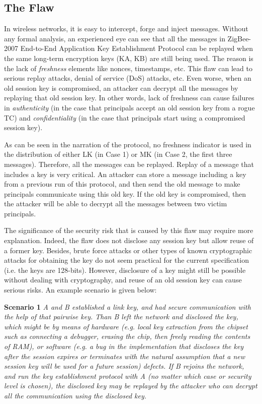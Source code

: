 \subsection{The Flaw}
\label{flaw}
In wireless networks, it is easy to intercept, forge and inject messages. 
Without any formal analysis, an experienced eye can see that all the messages in ZigBee-2007 End-to-End Application Key Establishment Protocol can be replayed 
when the same long-term encryption keys (KA, KB) are still being used. 
The reason is the lack of \emph{freshness} elements like nonces, timestamps, etc. 
This flaw can lead to serious replay attacks, denial of service (DoS) attacks, etc. 
Even worse, when an old session key is compromised, an attacker can decrypt all the messages by replaying that old session key. In other words, lack of freshness can cause failures in \emph{authenticity} (in the case that principals accept an old session key from a rogue TC) and \emph{confidentiality} (in the case that principals start using a compromised session key).

As can be seen in the narration of the protocol, no freshness indicator is used in the distribution of either LK (in Case 1) or MK (in Case 2, the first three messages). 
Therefore, all the messages can be replayed. 
Replay of a message that includes a key is very critical. 
An attacker can store a message including a key from a previous run of this protocol, and then send the old message to make principals communicate using this old key. 
If the old key is compromised, then the attacker will be able to decrypt all the messages between two victim principals. 

The significance of the security risk that is caused by this flaw may require more explanation. 
Indeed, the flaw does not disclose any session key but allow reuse of a former key. 
Besides, brute force attacks or other types of known cryptographic
attacks for obtaining the key do not seem practical for the current
specification (i.e. the keys are 128-bits).
However, disclosure of a key might still be possible without dealing with cryptography, and reuse of an old session key can cause serious risks.
An example scenario is given below:

\textbf{Scenario 1}  \textit{A and B established a link key, and had secure communication with the help of that pairwise key. 
Than B left the network and disclosed the key, which might be by means
of hardware (e.g. local key extraction from the chipset such as  connecting a debugger, erasing the chip, then freely reading the contents of RAM), 
or software (e.g. a bug in the implementation that discloses the key
after the session expires or terminates with the natural assumption
that a new session key will be used for a future session) defects. If
B rejoins the network, and run the key establishment protocol with A (no
matter which case or security level is chosen), the disclosed key may
be replayed by the attacker who can decrypt all the communication using
the disclosed key.}

